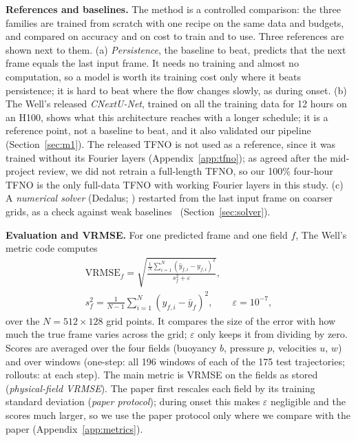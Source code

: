 \documentclass[11pt]{article}
\begin{document}
\textbf{References and baselines.} The method is a controlled comparison: the three families are trained from
scratch with one recipe on the same data and budgets, and compared on accuracy and on cost to train and to use.
Three references are shown next to them. (a) \emph{Persistence}, the baseline to beat, predicts that the next frame
equals the last input frame. It needs no training and almost no computation, so a model is worth its training cost
only where it beats persistence; it is hard to beat where the flow changes slowly, as during onset. (b) The Well's
released \emph{CNextU-Net}, trained on all the training data for 12 hours on an H100, shows what this architecture
reaches with a longer schedule; it is a reference point, not a baseline to beat, and it also validated our pipeline
(Section~\ref{sec:m1}). The released TFNO is not used as a reference, since it was trained without its Fourier
layers (Appendix~\ref{app:tfno}); as agreed after the mid-project review, we did not retrain a full-length TFNO, so our
100\% four-hour TFNO is the only full-data TFNO with working Fourier layers in this study. (c) A \emph{numerical solver} (Dedalus; \citealp{burns2020dedalus}) restarted from the
last input frame on coarser grids, as a check against weak baselines~\cite{mcgreivy2024weak}
(Section~\ref{sec:solver}).

\textbf{Evaluation and VRMSE.} For one predicted frame and one field $f$, The Well's metric code computes
\begin{gather*}
\mathrm{VRMSE}_f=\sqrt{\frac{\frac{1}{N}\sum_{i=1}^{N}(\hat y_{f,i}-y_{f,i})^2}{s_f^2+\varepsilon}},\\
s_f^2=\frac{1}{N-1}\sum_{i=1}^{N}(y_{f,i}-\bar y_f)^2,\qquad \varepsilon=10^{-7},
\end{gather*}
over the $N=512\times128$ grid points. It compares the size of the error with how much the true frame varies across
the grid; $\varepsilon$ only keeps it from dividing by zero. Scores are averaged over the four fields (buoyancy $b$,
pressure $p$, velocities $u$, $w$) and over windows (one-step: all 196 windows of each of the 175 test trajectories;
rollouts: at each step). The main metric is VRMSE on the fields as stored (\emph{physical-field VRMSE}). The paper
first rescales each field by its training standard deviation (\emph{paper protocol}); during onset this makes
$\varepsilon$ negligible and the scores much larger, so we use the paper protocol only where we compare with the
paper (Appendix~\ref{app:metrics}).
\end{document}
